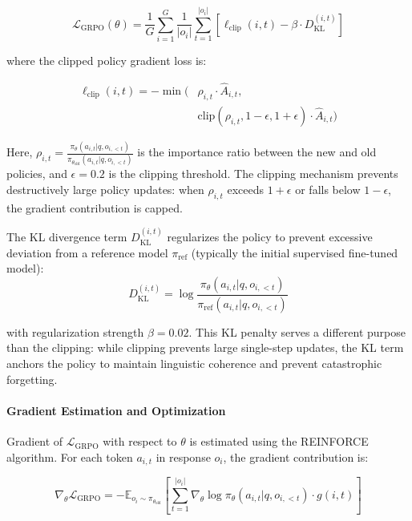 \documentclass[11pt]{article}
\begin{document}
\vspace{-1.5em}

$$\mathcal{L}_{\text{GRPO}}(\theta) = \frac{1}{G}\sum_{i=1}^{G} \frac{1}{|o_i|}\sum_{t=1}^{|o_i|} \left[ \ell_{\text{clip}}(i,t) - \beta \cdot D_{\text{KL}}^{(i,t)} \right]$$

where the clipped policy gradient loss is:

\vspace{-1.5em}

\begin{align*}
\ell_{\text{clip}}(i,t) = -\min\Big( 
    & \rho_{i,t} \cdot \hat{A}_{i,t}, \\
    & \text{clip}(\rho_{i,t}, 1-\epsilon, 1+\epsilon) \cdot \hat{A}_{i,t} 
\Big)
\end{align*}


Here, $\rho_{i,t} = \frac{\pi_\theta(a_{i,t} | q, o_{i,<t})}{\pi_{\theta_{\text{old}}}(a_{i,t} | q, o_{i,<t})}$ is the importance ratio between the new and old policies, and $\epsilon = 0.2$ is the clipping threshold. The clipping mechanism prevents destructively large policy updates: when $\rho_{i,t}$ exceeds $1+\epsilon$ or falls below $1-\epsilon$, the gradient contribution is capped.

The KL divergence term $D_{\text{KL}}^{(i,t)}$ regularizes the policy to prevent excessive deviation from a reference model $\pi_{\text{ref}}$ (typically the initial supervised fine-tuned model):
$$D_{\text{KL}}^{(i,t)} = \log\frac{\pi_\theta(a_{i,t} | q, o_{i,<t})}{\pi_{\text{ref}}(a_{i,t} | q, o_{i,<t})}$$

with regularization strength $\beta = 0.02$. This KL penalty serves a different purpose than the clipping: while clipping prevents large single-step updates, the KL term anchors the policy to maintain linguistic coherence and prevent catastrophic forgetting.

\paragraph{Gradient Estimation and Optimization} Gradient of $\mathcal{L}_{\text{GRPO}}$ with respect to $\theta$ is estimated using the REINFORCE algorithm. For each token $a_{i,t}$ in response $o_i$, the gradient contribution is:

\vspace{-1.5em}

{\small
\begin{equation*}
\nabla_\theta \mathcal{L}_{\text{GRPO}} 
= -\mathbb{E}_{o_i \sim \pi_{\theta_{\text{old}}}}
\left[ \sum_{t=1}^{|o_i|} \nabla_\theta 
\log \pi_\theta(a_{i,t}|q, o_{i,<t}) \cdot g(i,t) \right]
\end{equation*}
}
\end{document}
